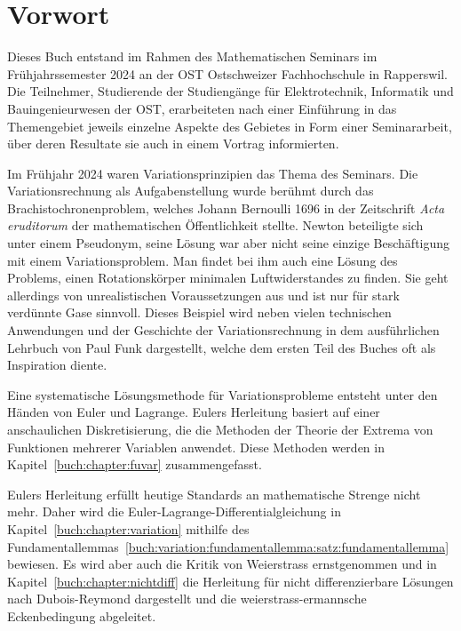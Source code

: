%
%
%
\chapter*{Vorwort}


Dieses Buch entstand im Rahmen des Mathematischen Seminars
im Frühjahrssemester 2024 an der OST Ostschweizer Fachhochschule in Rapperswil.
Die Teilnehmer, Studierende der Studiengänge für Elektrotechnik, Informatik
und Bauingenieurwesen
der OST, erarbeiteten nach einer Einführung in das Themengebiet jeweils
einzelne Aspekte des Gebietes in Form einer Seminararbeit, über
deren Resultate sie auch in einem Vortrag informierten. 

Im Frühjahr 2024 waren Variationsprinzipien das Thema des Seminars.
Die Variationsrechnung als Aufgabenstellung wurde berühmt durch
das Brachistochronenproblem, welches Johann Bernoulli 1696 in der
Zeitschrift {\em Acta eruditorum} der mathematischen Öffentlichkeit
stellte.
Newton beteiligte sich unter einem Pseudonym, seine Lösung war aber nicht
seine einzige Beschäftigung mit einem Variationsproblem.
Man findet bei ihm auch eine Lösung des Problems, einen Rotationskörper
minimalen Luftwiderstandes zu finden.
Sie geht allerdings von unrealistischen Voraussetzungen aus und ist
nur für stark verdünnte Gase sinnvoll.
Dieses Beispiel wird neben vielen technischen Anwendungen und 
der Geschichte der Variationsrechnung in dem ausführlichen Lehrbuch
\cite{buch:funk} von Paul Funk dargestellt, welche dem ersten Teil
des Buches oft als Inspiration diente.

Eine systematische Lösungsmethode für Variationsprobleme entsteht unter
den Händen von Euler und Lagrange.
Eulers Herleitung basiert auf einer anschaulichen Diskretisierung,
die die Methoden der Theorie der Extrema von Funktionen mehrerer
Variablen anwendet.
Diese Methoden werden in Kapitel~\ref{buch:chapter:fuvar}
zusammengefasst.

Eulers Herleitung erfüllt heutige Standards an mathematische
Strenge nicht mehr.
Daher wird die Euler-Lagrange-Differentialgleichung in
Kapitel~\ref{buch:chapter:variation} mithilfe des
Fundamentallemmas~\ref{buch:variation:fundamentallemma:satz:fundamentallemma}
bewiesen.
Es wird aber auch die Kritik von Weierstrass ernstgenommen und
in Kapitel~\ref{buch:chapter:nichtdiff} die
Herleitung für nicht differenzierbare Lösungen nach Dubois-Reymond
dargestellt und die weierstrass-ermannsche Eckenbedingung abgeleitet.

